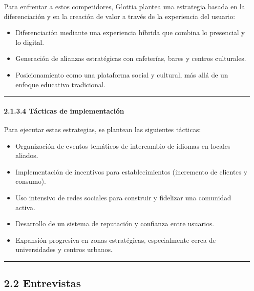 Para enfrentar a estos competidores, Glottia plantea una estrategia
basada en la diferenciación y en la creación de valor a través de la
experiencia del usuario:

\begin{itemize}
\tightlist
\item
  Diferenciación mediante una experiencia híbrida que combina lo
  presencial y lo digital.
\item
  Generación de alianzas estratégicas con cafeterías, bares y centros
  culturales.
\item
  Posicionamiento como una plataforma social y cultural, más allá de un
  enfoque educativo tradicional.
\end{itemize}

\begin{center}\rule{0.5\linewidth}{0.5pt}\end{center}

\paragraph{2.1.3.4 Tácticas de
implementación}\label{report__20-cap2-requirements-analysis.md__tuxe1cticas-de-implementaciuxf3n}

Para ejecutar estas estrategias, se plantean las siguientes tácticas:

\begin{itemize}
\tightlist
\item
  Organización de eventos temáticos de intercambio de idiomas en locales
  aliados.
\item
  Implementación de incentivos para establecimientos (incremento de
  clientes y consumo).
\item
  Uso intensivo de redes sociales para construir y fidelizar una
  comunidad activa.
\item
  Desarrollo de un sistema de reputación y confianza entre usuarios.
\item
  Expansión progresiva en zonas estratégicas, especialmente cerca de
  universidades y centros urbanos.
\end{itemize}

\begin{center}\rule{0.5\linewidth}{0.5pt}\end{center}

\subsection{2.2
Entrevistas}\label{report__20-cap2-requirements-analysis.md__entrevistas}

